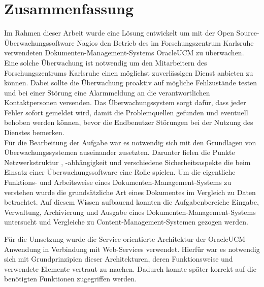 \section{Zusammenfassung}

Im Rahmen dieser Arbeit wurde eine Lösung entwickelt um mit der Open Source-Überwachungssoftware Nagios den Betrieb des im Forschungszentrum Karlsruhe verwendeten Dokumenten-Management-Systems \gls{OracleUCM} zu überwachen.
Eine solche Überwachung ist notwendig um den Mitarbeitern des Forschungszentrums Karlsruhe einen möglichst zuverlässigen Dienst anbieten zu können.
Dabei sollte die Überwachung proaktiv auf mögliche Fehlzustände testen und bei einer Störung eine Alarmmeldung an die verantwortlichen Kontaktpersonen versenden. 
Das Überwachungssystem sorgt dafür, dass jeder Fehler sofort gemeldet wird, damit die Problemquellen gefunden und eventuell behoben werden können, bevor die Endbenutzer Störungen bei der Nutzung des Dienstes bemerken.\\

Für die Bearbeitung der Aufgabe war es notwendig sich mit den Grundlagen von Überwachungssystemen auseinander zusetzten.
Darunter fielen die Punkte Netzwerkstruktur , -abhängigkeit und verschiedene Sicherheitsaspekte die beim Einsatz einer Überwachungssoftware eine Rolle spielen.
Um die eigentliche Funktions- und Arbeitsweise eines Dokumenten-Management-Systems zu verstehen wurde die grundsätzliche Art eines Dokumentes im Vergleich zu Daten betrachtet.
Auf diesem Wissen aufbauend konnten die Aufgabenbereiche Eingabe, Verwaltung, Archivierung und Ausgabe eines Dokumenten-Management-Systems untersucht und Vergleiche zu Content-Management-Systemen gezogen werden.

Für die Umsetzung wurde die Service-orientierte Architektur der \gls{OracleUCM}-Anwendung in Verbindung mit Web-Services verwendet.
Hierfür war es notwendig sich mit Grundprinzipien dieser Architekturen, deren Funktionsweise und verwendete Elemente vertraut zu machen.
Dadurch konnte später korrekt auf die benötigten Funktionen zugegriffen werden.\\

